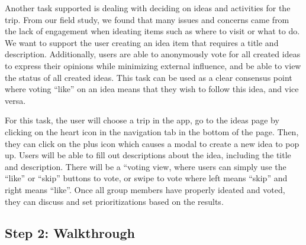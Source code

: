 \documentclass[12pt,a4paper]{article}
\begin{document}
\par
\indent
Another task supported is dealing with deciding on ideas and activities for the trip. From our field study, we found that many issues and concerns came from the lack of engagement when ideating items such as where to visit or what to do. We want to support the user creating an idea item that requires a title and description. Additionally, users are able to anonymously vote for all created ideas to express their opinions while minimizing external influence, and be able to view the status of all created ideas. This task can be used as a clear consensus point where voting “like” on an idea means that they wish to follow this idea, and vice versa. 
\\

\par
\indent
For this task, the user will choose a trip in the app, go to the ideas page by clicking on the heart icon in the navigation tab in the bottom of the page. Then, they can click on the plus icon which causes a modal to create a new idea to pop up. Users will be able to fill out descriptions about the idea, including the title and description. There will be a “voting view, where users can simply use the “like” or “skip” buttons to vote, or swipe to vote where left means “skip” and right means “like”. Once all group members have properly ideated and voted, they can discuss and set prioritizations based on the results.
\newpage

\subsection{Step 2: Walkthrough}
\end{document}
